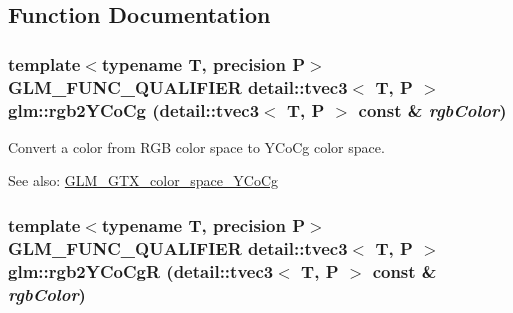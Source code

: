 \subsection{Function Documentation}
\hypertarget{group__gtx__color__space___y_co_cg_gfd5ca4a311e055d522c031650e528b02}{
\subsubsection[rgb2YCoCg]{\setlength{\rightskip}{0pt plus 5cm}template$<$typename T, precision P$>$ GLM\_\-FUNC\_\-QUALIFIER detail::tvec3$<$ T, P $>$ glm::rgb2YCoCg (detail::tvec3$<$ T, P $>$ const \& {\em rgbColor})}}
\label{group__gtx__color__space___y_co_cg_gfd5ca4a311e055d522c031650e528b02}


Convert a color from RGB color space to YCoCg color space. \begin{Desc}
\item[See also:]\hyperlink{group__gtx__color__space___y_co_cg}{GLM\_\-GTX\_\-color\_\-space\_\-YCoCg} \end{Desc}
\hypertarget{group__gtx__color__space___y_co_cg_gda2dcb113c669093c7099dc58f26fb7c}{
\subsubsection[rgb2YCoCgR]{\setlength{\rightskip}{0pt plus 5cm}template$<$typename T, precision P$>$ GLM\_\-FUNC\_\-QUALIFIER detail::tvec3$<$ T, P $>$ glm::rgb2YCoCgR (detail::tvec3$<$ T, P $>$ const \& {\em rgbColor})}}
\label{group__gtx__color__space___y_co_cg_gda2dcb113c669093c7099dc58f26fb7c}


